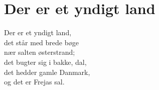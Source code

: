 \section{Der er et yndigt land}
Der er et yndigt land,\\
det står med brede bøge\\
nær salten østerstrand;\\
det bugter sig i bakke, dal,\\
det hedder gamle Danmark,\\
og det er Frejas sal.\\